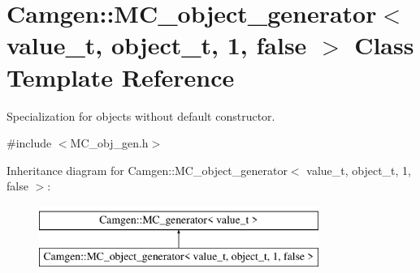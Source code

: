 \hypertarget{a00365}{\section{Camgen\-:\-:M\-C\-\_\-object\-\_\-generator$<$ value\-\_\-t, object\-\_\-t, 1, false $>$ Class Template Reference}
\label{a00365}
}


Specialization for objects without default constructor.  




{\ttfamily \#include $<$M\-C\-\_\-obj\-\_\-gen.\-h$>$}

Inheritance diagram for Camgen\-:\-:M\-C\-\_\-object\-\_\-generator$<$ value\-\_\-t, object\-\_\-t, 1, false $>$\-:\begin{figure}[H]
\begin{center}
\leavevmode
\includegraphics[height=2.000000cm]{a00365}
\end{center}
\end{figure}
